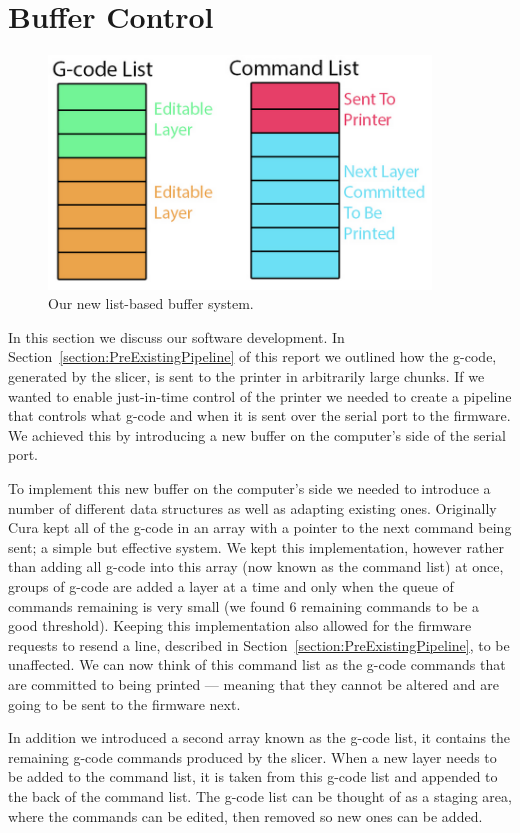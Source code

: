 \documentclass[pdftex, 11pt]{report} %
\begin{document}
\section{Buffer Control}
\label{section:BufferControl}
\begin{figure}[H]
  \centering
  \includegraphics[width=4in]{james_two_lists.png}
  \caption{Our new list-based buffer system.}
  \label{figure:Jlists}
\end{figure}
In this section we discuss our software development. In Section~\ref{section:PreExistingPipeline} of this report we outlined how the g-code, generated by the slicer, is sent to the printer in arbitrarily large chunks. If we wanted to enable just-in-time control of the printer we needed to create a pipeline that controls what g-code and when it is sent over the serial port to the firmware. We achieved this by introducing a new buffer on the computer's side of the serial port.

To implement this new buffer on the computer's side we needed to introduce a number of different data structures as well as adapting existing ones. Originally Cura kept all of the g-code in an array with a pointer to the next command being sent; a simple but effective system. We kept this implementation, however rather than adding all g-code into this array (now known as the command list) at once, groups of g-code are added a layer at a time and only when the queue of commands remaining is very small (we found 6 remaining commands to be a good threshold). Keeping this implementation also allowed for the firmware requests to resend a line, described in Section~\ref{section:PreExistingPipeline}, to be unaffected. We can now think of this command list as the g-code commands that are committed to being printed --- meaning that they cannot be altered and are going to be sent to the firmware next.

In addition we introduced a second array known as the g-code list, it contains the remaining g-code commands produced by the slicer. When a new layer needs to be added to the command list, it is taken from this g-code list and appended to the back of the command list. The g-code list can be thought of as a staging area, where the commands can be edited, then removed so new ones can be added.
\end{document}
